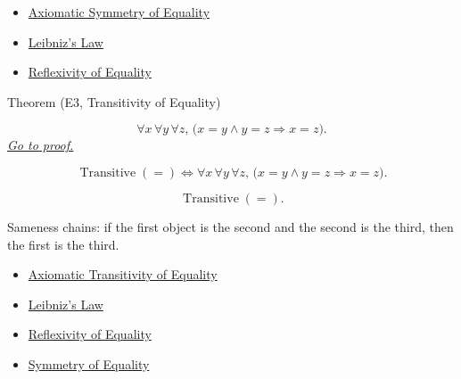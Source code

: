 \begin{dependencies}
\begin{itemize}
  \item \hyperref[thm:axiomatic-equality-symmetry]{Axiomatic Symmetry of Equality}
  \item \hyperref[ax:leibniz-law]{Leibniz's Law}
  \item \hyperref[ax:equality-reflexivity]{Reflexivity of Equality}
\end{itemize}
\end{dependencies}

\begin{theorembox}{Theorem (E3, Transitivity of Equality)}
\begin{theorem}
\label{thm:equality-transitivity}
\[
\forall x\,\forall y\,\forall z,\,
\bigl(x=y \land y=z \Longrightarrow x=z\bigr).
\]
\hyperref[prf:equality-transitivity]{\textit{Go to proof.}}
\end{theorem}
\end{theorembox}

\begin{remark*}
\[
\operatorname{Transitive}(=)
\Longleftrightarrow
\forall x\,\forall y\,\forall z,\,
\bigl(x=y \land y=z \Longrightarrow x=z\bigr).
\]
\end{remark*}

\begin{remark*}
\[
\operatorname{Transitive}(=).
\]
\end{remark*}

\begin{remark*}[Interpretation]
Sameness chains: if the first object is the second and the second is the
third, then the first is the third.
\end{remark*}

\begin{dependencies}
\begin{itemize}
  \item \hyperref[thm:axiomatic-equality-transitivity]{Axiomatic Transitivity of Equality}
  \item \hyperref[ax:leibniz-law]{Leibniz's Law}
  \item \hyperref[ax:equality-reflexivity]{Reflexivity of Equality}
  \item \hyperref[thm:equality-symmetry]{Symmetry of Equality}
\end{itemize}
\end{dependencies}

